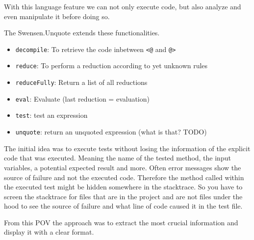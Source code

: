 \noindent With this language feature we can not only execute code, but also analyze and even manipulate it before doing so.

The Swensen.Unquote extends these functionalities.
\begin{itemize}
    \item \texttt{decompile}: To retrieve the code inbetween \texttt{<@} and \texttt{@>}
    \item \texttt{reduce}: To perform a reduction according to yet unknown rules
    \item \texttt{reduceFully}: Return a list of all reductions
    \item \texttt{eval}: Evaluate (last reduction = evaluation)
    \item \texttt{test}: test an expression
    \item \texttt{unquote}: return an unquoted expression (what is that? TODO)
\end{itemize}




The initial idea was to execute tests without losing the information of the explicit code that was executed.
Meaning the name of the tested method, the input variables, a potential expected result and more.
Often error messages show the source of failure and not the executed code. Therefore the method called within the executed test might be hidden somewhere in the stacktrace.
So you have to screen the stacktrace for files that are in the project and are not files under the hood to see the source of failure and what line of code caused it in the test file.

From this POV the approach was to extract the most crucial information and display it with a clear format.

